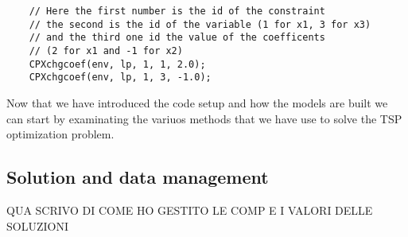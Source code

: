 \begin{lstlisting}
	// Here the first number is the id of the constraint
	// the second is the id of the variable (1 for x1, 3 for x3)
	// and the third one id the value of the coefficents
	// (2 for x1 and -1 for x2)
	CPXchgcoef(env, lp, 1, 1, 2.0);
	CPXchgcoef(env, lp, 1, 3, -1.0);
\end{lstlisting}

Now that we have introduced the code setup and how the models are built we can start by examinating the variuos methods that we have use to solve the TSP optimization problem.

\subsection{Solution and data management}
\label{sec:sol_management}
QUA SCRIVO DI COME HO GESTITO LE COMP E I VALORI DELLE SOLUZIONI